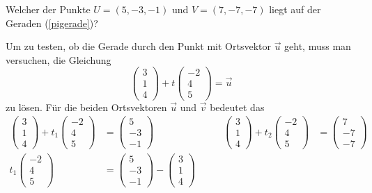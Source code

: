 \begin{beispiel} Welcher der Punkte $U=(5,-3,-1)$ und $V=(7,-7,-7)$
liegt auf der Geraden (\ref{pigerade})?

\smallskip

{\parindent 0pt Um zu testen},
ob die Gerade durch den Punkt mit Ortsvektor $\vec u$
geht, muss man versuchen, die Gleichung
\[
\begin{pmatrix}3\\1\\4 \end{pmatrix}
+t
\begin{pmatrix}-2\\4\\5\end{pmatrix}
=\vec u
\]
zu lösen.
Für die beiden Ortsvektoren $\vec u$ und $\vec v$
bedeutet das
\begin{align*}
\begin{pmatrix}3\\1\\4 \end{pmatrix}
+
t_1
\begin{pmatrix}-2\\4\\5\end{pmatrix}
&=
\begin{pmatrix}5\\-3\\-1\end{pmatrix}
&
\qquad
\begin{pmatrix}3\\1\\4 \end{pmatrix}
+
t_2
\begin{pmatrix}-2\\4\\5\end{pmatrix}
&=
\begin{pmatrix}7\\-7\\-7\end{pmatrix}
\\
t_1
\begin{pmatrix}-2\\4\\5\end{pmatrix}
&=
\begin{pmatrix}5\\-3\\-1\end{pmatrix}
-
\begin{pmatrix}3\\1\\4 \end{pmatrix}

\end{align*}
\end{beispiel}
